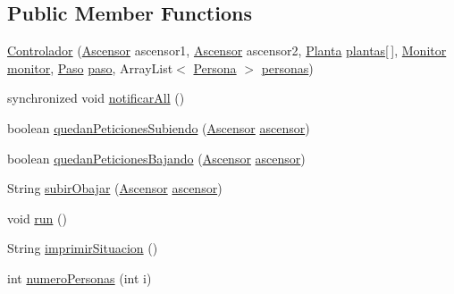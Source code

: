 \subsection*{Public Member Functions}
\begin{DoxyCompactItemize}
\item 
\mbox{\hyperlink{classpecl6part2_1_1_controlador_a99e61c93190cd720977fe02b686bd34f}{Controlador}} (\mbox{\hyperlink{classpecl6part2_1_1_ascensor}{Ascensor}} ascensor1, \mbox{\hyperlink{classpecl6part2_1_1_ascensor}{Ascensor}} ascensor2, \mbox{\hyperlink{classpecl6part2_1_1_planta}{Planta}} \mbox{\hyperlink{classpecl6part2_1_1_controlador_a7706d274fde82fed01a03a619fbcd77c}{plantas}}\mbox{[}$\,$\mbox{]}, \mbox{\hyperlink{classpecl6part2_1_1_monitor}{Monitor}} \mbox{\hyperlink{classpecl6part2_1_1_controlador_a7fc29467f824a892431dc36c908857c7}{monitor}}, \mbox{\hyperlink{classpecl6part2_1_1_paso}{Paso}} \mbox{\hyperlink{classpecl6part2_1_1_controlador_ae07ed4d274035a923387361c19e5ce79}{paso}}, Array\+List$<$ \mbox{\hyperlink{classpecl6part2_1_1_persona}{Persona}} $>$ \mbox{\hyperlink{classpecl6part2_1_1_controlador_a570bc37c2db22f144af250ceccbbab6d}{personas}})
\item 
synchronized void \mbox{\hyperlink{classpecl6part2_1_1_controlador_a2e087cef6532a04ea337269e613393c1}{notificar\+All}} ()
\item 
boolean \mbox{\hyperlink{classpecl6part2_1_1_controlador_a759775f24cc82dc8b5ef275e42a12e3a}{quedan\+Peticiones\+Subiendo}} (\mbox{\hyperlink{classpecl6part2_1_1_ascensor}{Ascensor}} \mbox{\hyperlink{classpecl6part2_1_1_controlador_ac2f7c4abd5447ea5daeeb7d62bf3f591}{ascensor}})
\item 
boolean \mbox{\hyperlink{classpecl6part2_1_1_controlador_a18f3f9c74dda296867c72588a840880c}{quedan\+Peticiones\+Bajando}} (\mbox{\hyperlink{classpecl6part2_1_1_ascensor}{Ascensor}} \mbox{\hyperlink{classpecl6part2_1_1_controlador_ac2f7c4abd5447ea5daeeb7d62bf3f591}{ascensor}})
\item 
String \mbox{\hyperlink{classpecl6part2_1_1_controlador_a31e86324ff7658f72c803a7ac0c5af5b}{subir\+Obajar}} (\mbox{\hyperlink{classpecl6part2_1_1_ascensor}{Ascensor}} \mbox{\hyperlink{classpecl6part2_1_1_controlador_ac2f7c4abd5447ea5daeeb7d62bf3f591}{ascensor}})
\item 
void \mbox{\hyperlink{classpecl6part2_1_1_controlador_a82ec0f1c651211c44a58dc437827b703}{run}} ()
\item 
String \mbox{\hyperlink{classpecl6part2_1_1_controlador_a0a6c024e0bdec3f6d8092e0b716db729}{imprimir\+Situacion}} ()
\item 
int \mbox{\hyperlink{classpecl6part2_1_1_controlador_a92fef133fc0a5fcfa1b483b83a4d3f7d}{numero\+Personas}} (int i)
\end{DoxyCompactItemize}

